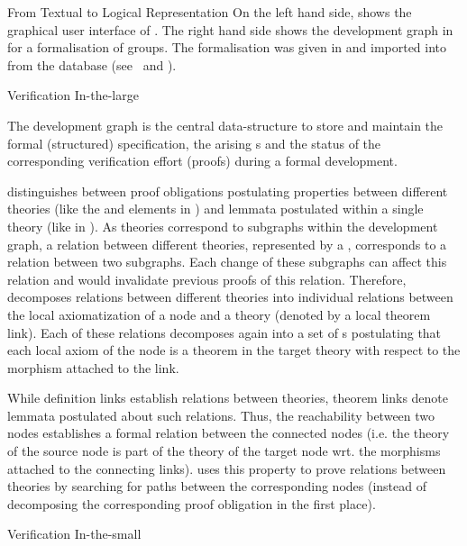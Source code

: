 \begin{omgroup}[id=maya,short=Maya,creators={autexier,hutter,mossakowski,shairer}]
\begin{omgroup}{From Textual to Logical Representation}
On the left hand side, {} shows the graphical user interface of
{\maya}. The right hand side shows the development graph in {\maya} for a formalisation of
groups. The formalisation was given in {\omdoc} and imported into {\maya} from the
{\omdoc} database {\mbase} (see~\cite{KohFra:rkcimss01} and {}).
\end{omgroup}

\begin{omgroup}{Verification In-the-large}

The development graph is the central data-structure to store and maintain the formal
(structured) specification, the arising {s} and the status of
the corresponding verification effort (proofs) during a formal development.

{\maya} distinguishes between proof obligations postulating properties between different
theories (like the {} and {} elements
in {\omdoc}) and lemmata postulated within a single theory (like {} in
{\omdoc}).  As theories correspond to subgraphs within the development graph, a relation
between different theories, represented by a {},
corresponds to a relation between two subgraphs.  Each change of these subgraphs can
affect this relation and would invalidate previous proofs of this relation. Therefore,
{\maya} decomposes relations between different theories into individual relations between
the local axiomatization of a node and a theory (denoted by a local theorem link). Each of
these relations decomposes again into a set of {s} postulating
that each local axiom of the node is a theorem in the target theory with respect to the
morphism attached to the link.

While definition links establish relations between theories, theorem links denote
lemmata postulated about such relations. Thus, the reachability between two nodes
establishes a formal relation between the connected nodes (i.e. the theory of the
source node is part of the theory of the target node wrt. the morphisms attached
to the connecting links). {\maya} uses this property to prove relations between
theories by searching for paths between the corresponding nodes (instead of
decomposing the corresponding proof obligation in the first place).
\end{omgroup}

\begin{omgroup}{Verification In-the-small}


\end{omgroup}
\end{omgroup}
